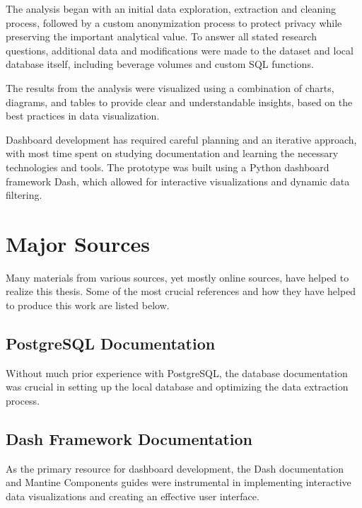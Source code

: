 The analysis began with an initial data exploration, extraction and cleaning process, followed by a custom anonymization process to protect privacy while preserving the important analytical value.
To answer all stated research questions, additional data and modifications were made to the dataset and local database itself, including beverage volumes and custom SQL functions.

The results from the analysis were visualized using a combination of charts, diagrams, and tables to provide clear and understandable insights, based on the best practices in data visualization.

Dashboard development has required careful planning and an iterative approach, with most time spent on studying documentation and learning the necessary technologies and tools.
The prototype was built using a Python dashboard framework Dash, which allowed for interactive visualizations and dynamic data filtering.

\section*{Major Sources}
\label{sec:major-sources}
Many materials from various sources, yet mostly online sources, have helped to realize this thesis.
Some of the most crucial references and how they have helped to produce this work are listed below.

\subsection*{PostgreSQL Documentation}
\label{subsec:postgresql-documentation}
Without much prior experience with PostgreSQL, the database documentation was crucial in setting up the local database and optimizing the data extraction process.

\small{}

\subsection*{Dash Framework Documentation}
\label{subsec:dash-framework-documentation}
As the primary resource for dashboard development, the Dash documentation and Mantine Components guides were instrumental in implementing interactive data visualizations and creating an effective user interface.

\small{}
\small{}

